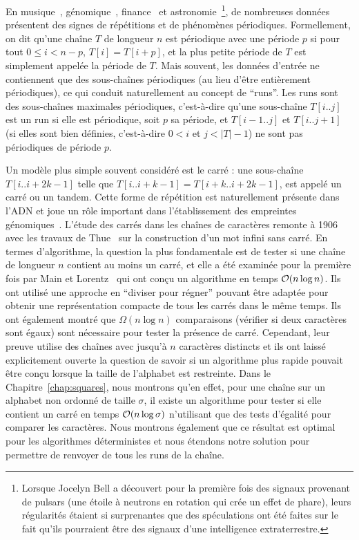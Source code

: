 En musique~\cite{arom1989time}, génomique~\cite{pich2018somatic}, finance~\cite{harvey2007trends} et astronomie~\cite{hewish1979observation}\footnote{ Lorsque Jocelyn Bell a découvert pour la première fois des signaux provenant de pulsars (une étoile à neutrons en rotation qui crée un effet de phare), leurs régularités étaient si surprenantes que des spéculations ont été faites sur le fait qu'ils pourraient être des signaux d'une intelligence extraterrestre.}, de nombreuses données présentent des signes de répétitions et de phénomènes périodiques.
Formellement, on dit qu'une chaîne $T$ de longueur $n$ est périodique avec une période $p$ si pour tout $0 \leq i < n - p$, $T[i]=T[i+p]$, et la plus petite période de $T$ est simplement appelée la période de $T$.
%
Mais souvent, les données d'entrée ne contiennent que des sous-chaînes périodiques (au lieu d'être entièrement périodiques), ce qui conduit naturellement au concept de ``runs''. Les runs sont des sous-chaînes maximales périodiques, c'est-à-dire qu'une sous-chaîne $T[i..j]$ est un run si elle est périodique, soit $p$ sa période, et $T[i-1..j]$ et $T[i..j+1]$ (si elles sont bien définies, c'est-à-dire $0<i$ et $j<|T|-1$) ne sont pas périodiques de période $p$. 

Un modèle plus simple souvent considéré est le carré : une sous-chaîne $T[i..i+2k-1]$ telle que $T[i..i+k-1]=T[i+k..i+2k-1]$, est appelé un carré ou un tandem. Cette forme de répétition est naturellement présente dans l'ADN et joue un rôle important dans l'établissement des empreintes génomiques~\cite{Kolpakov2003,GYMREK20179}. 
%
L'étude des carrés dans les chaînes de caractères remonte à 1906 avec les travaux de Thue~\cite{thue1906} sur la construction d'un mot infini sans carré. En termes d'algorithme, la question la plus fondamentale est de tester si une chaîne de longueur $n$ contient au moins un carré, et elle a été examinée pour la première fois par Main et Lorentz~\cite{Main1984} qui ont conçu un algorithme en temps $\mathcal{O}(n \log n)$. Ils ont utilisé une approche en ``diviser pour régner'' pouvant être adaptée pour obtenir une représentation compacte de tous les carrés dans le même temps. Ils ont également montré que $\Omega(n\log n)$ comparaisons (vérifier si deux caractères sont égaux) sont nécessaire pour tester la présence de carré. Cependant, leur preuve utilise des chaînes avec jusqu'à $n$ caractères distincts et ils ont laissé explicitement ouverte la question de savoir si un algorithme plus rapide pouvait être conçu lorsque la taille de l'alphabet est restreinte. 
Dans le Chapitre~\ref{chap:squares}, nous montrons qu'en effet, pour une chaîne sur un alphabet non ordonné de taille $\sigma$, il existe un algorithme pour tester si elle contient un carré en temps $\mathcal{O}(n\log \sigma)$ n'utilisant que des tests d'égalité pour comparer les caractères. Nous montrons également que ce résultat est optimal pour les algorithmes déterministes et nous étendons notre solution pour permettre de renvoyer de tous les runs de la chaîne.

